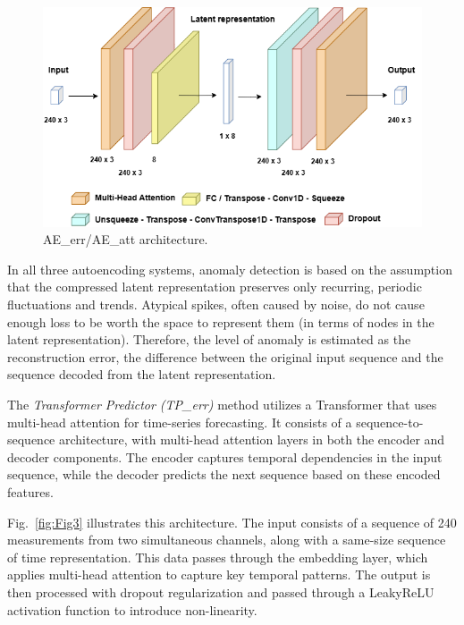 \documentclass[runningheads]{llncs}
\begin{document}
\begin{figure}[tb]
\centering
\includegraphics[width=1\columnwidth]{images/Fig2.png}  
\caption{\label{fig:Fig2} AE\_err/AE\_att architecture.}
\end{figure}

In all three autoencoding systems, anomaly detection is based on the
assumption that the compressed latent representation preserves only
recurring, periodic fluctuations and trends. Atypical spikes, often
caused by noise, do not cause enough loss to be worth the space to
represent them (in terms of nodes in the latent representation).
Therefore, the level of anomaly is estimated as the reconstruction
error, the difference between the original input sequence and the
sequence decoded from the latent representation.

The \emph{Transformer Predictor (TP\_err)} method utilizes a
Transformer that uses multi-head attention for time-series
forecasting. It consists of a sequence-to-sequence architecture, with
multi-head attention layers in both the encoder and decoder
components. The encoder captures temporal dependencies in the input
sequence, while the decoder predicts the next sequence based on these
encoded features.

Fig.~\ref{fig:Fig3} illustrates this architecture. The input consists
of a sequence of 240 measurements from two simultaneous channels,
along with a same-size sequence of time representation. This data
passes through the embedding layer, which applies multi-head attention
to capture key temporal patterns. The output is then processed with
dropout regularization and passed through a LeakyReLU activation
function to introduce non-linearity.
\end{document}
